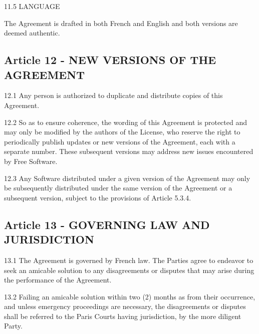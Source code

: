 11.5 LANGUAGE

The Agreement is drafted in both French and English and both versions are deemed authentic.

\subsection*{Article 12 - NEW VERSIONS OF THE AGREEMENT}

12.1 Any person is authorized to duplicate and distribute copies of this Agreement.

12.2 So as to ensure coherence, the wording of this Agreement is protected and may only be modified by the authors of the License, who reserve the right to periodically publish updates or new versions of the Agreement, each with a separate number. These subsequent versions may address new issues encountered by Free Software.

12.3 Any Software distributed under a given version of the Agreement may only be subsequently distributed under the same version of the Agreement or a subsequent version, subject to the provisions of Article 5.3.4.

\subsection*{Article 13 - GOVERNING LAW AND JURISDICTION}

13.1 The Agreement is governed by French law. The Parties agree to endeavor to seek an amicable solution to any disagreements or disputes that may arise during the performance of the Agreement.

13.2 Failing an amicable solution within two (2) months as from their occurrence, and unless emergency proceedings are necessary, the disagreements or disputes shall be referred to the Paris Courts having jurisdiction, by the more diligent Party.




